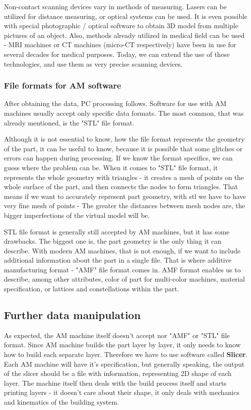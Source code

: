 \documentclass[a4paper, twoside, 11pt]{report}
\begin{document}
    
Non-contact scanning devices vary in methods of measuring. Lasers can be utilized for distance measuring, or optical systems can be used. It is even possible with special photographic / optical software to obtain 3D model from multiple pictures of an object. Also, methods already utilized in medical field can be used - MRI machines or CT machines (micro-CT respectively) have been in use for several decades for medical purposes. Today, we can extend the use of these technologies, and use them as very precise scanning devices.
\subsubsection{File formats for AM software}
After obtaining the data, PC processing follows. Software for use with AM machines usually accept only specific data formats. The most common, that was already mentioned, is the "STL" file format.

	Although it is not essential to know, how the file format represents the geometry of the part, it can be useful to know, because it is possible that some glitches or errors can happen during processing. If we know the format specifics, we can guess where the problem can be. When it comes to "STL" file format, it represents the whole geometry with triangles - it creates a mesh of points on the whole surface of the part, and then connects the nodes to form triangles. That means if we want to accurately represent part geometry, with stl we have to have very fine mesh of points - The greater the distances between mesh nodes are, the bigger imperfections of the virtual model will be.
	
	STL file format is generally still accepted by AM machines, but it has some drawbacks. The biggest one is, the part geometry is the only thing it can describe. With modern AM machines, that is not enough, if we want to include additional information about the part in a single file. That is where additive manufacturing format - "AMF" file format comes in. AMF format enables us to describe, among other attributes, color of part for multi-color machines, material specification, or lattices and constellations within the part.
\subsection{Further data manipulation}
As expected, the AM machine itself doesn't accept nor "AMF" or "STL" file format. Since AM machine builds the part layer by layer, it only needs to know how to build each separate layer. Therefore we have to use software called \textbf{Slicer}. Each AM machine will have it's specification, but generally speaking, the output of the slicer should be a file with information, representing 2D shape of each layer. The machine itself then deals with the build process itself and starts printing layers - it doesn't care about their shape, it only deals with mechanics and kinematics of the building system.
\end{document}
